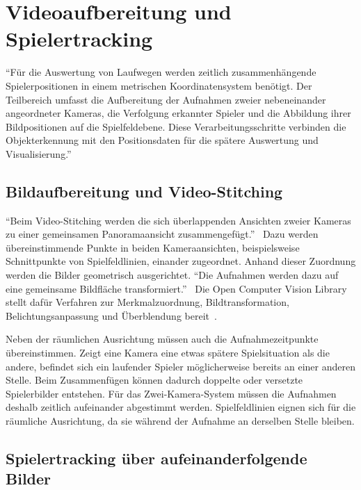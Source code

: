 \clearpage
\section{Videoaufbereitung und Spielertracking}

\label{sec:Grundlage-Akpinar}

\enquote{Für die Auswertung von Laufwegen werden zeitlich zusammenhängende
Spielerpositionen in einem metrischen Koordinatensystem benötigt.
Der Teilbereich umfasst die Aufbereitung der Aufnahmen zweier
nebeneinander angeordneter Kameras, die Verfolgung erkannter Spieler
und die Abbildung ihrer Bildpositionen auf die Spielfeldebene.
Diese Verarbeitungsschritte verbinden die Objekterkennung mit den
Positionsdaten für die spätere Auswertung und Visualisierung.}~\cite{akpinar-codex-20261029a}

\subsection{Bildaufbereitung und Video-Stitching}
\enquote{Beim Video-Stitching werden die sich überlappenden Ansichten zweier Kameras
zu einer gemeinsamen Panoramaansicht zusammengefügt.}~\cite{akpinar-codex-20261029a}
Dazu werden übereinstimmende Punkte in beiden Kameraansichten, beispielsweise Schnittpunkte von Spielfeldlinien, einander zugeordnet. Anhand dieser Zuordnung werden die Bilder geometrisch ausgerichtet.
\enquote{Die Aufnahmen werden dazu auf eine gemeinsame Bildfläche transformiert.}~\cite{akpinar-codex-20261029a}
Die Open Computer Vision Library stellt dafür Verfahren zur Merkmalzuordnung, Bildtransformation, Belichtungsanpassung und Überblendung bereit~\cite{akpinar-opencv-stitching}.

Neben der räumlichen Ausrichtung müssen auch die Aufnahmezeitpunkte
übereinstimmen. Zeigt eine Kamera eine etwas spätere Spielsituation als die
andere, befindet sich ein laufender Spieler möglicherweise bereits an einer
anderen Stelle. Beim Zusammenfügen können dadurch doppelte oder versetzte
Spielerbilder entstehen. Für das Zwei-Kamera-System müssen die Aufnahmen
deshalb zeitlich aufeinander abgestimmt werden. Spielfeldlinien eignen sich
für die räumliche Ausrichtung, da sie während der Aufnahme an derselben
Stelle bleiben.

\subsection{Spielertracking über aufeinanderfolgende Bilder}

